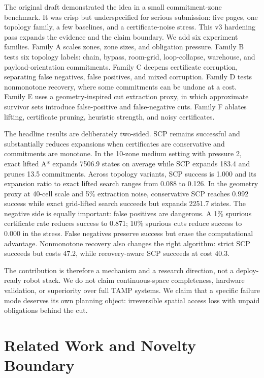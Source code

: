 \documentclass{article}
\begin{document}
The original draft demonstrated the idea in a small commitment-zone benchmark. It was crisp but underspecified for serious submission: five pages, one topology family, a few baselines, and a certificate-noise stress. This v3 hardening pass expands the evidence and the claim boundary. We add six experiment families. Family A scales zones, zone sizes, and obligation pressure. Family B tests six topology labels: chain, bypass, room-grid, loop-collapse, warehouse, and payload-orientation commitments. Family C deepens certificate corruption, separating false negatives, false positives, and mixed corruption. Family D tests nonmonotone recovery, where some commitments can be undone at a cost. Family E uses a geometry-inspired cut extraction proxy, in which approximate survivor sets introduce false-positive and false-negative cuts. Family F ablates lifting, certificate pruning, heuristic strength, and noisy certificates.

The headline results are deliberately two-sided. SCP remains successful and substantially reduces expansions when certificates are conservative and commitments are monotone. In the 10-zone medium setting with pressure 2, exact lifted A* expands 7506.9 states on average while SCP expands 183.4 and prunes 13.5 commitments. Across topology variants, SCP success is 1.000 and its expansion ratio to exact lifted search ranges from 0.088 to 0.126. In the geometry proxy at 40-cell scale and 5\% extraction noise, conservative SCP reaches 0.992 success while exact grid-lifted search succeeds but expands 2251.7 states. The negative side is equally important: false positives are dangerous. A 1\% spurious certificate rate reduces success to 0.871; 10\% spurious cuts reduce success to 0.000 in the stress. False negatives preserve success but erase the computational advantage. Nonmonotone recovery also changes the right algorithm: strict SCP succeeds but costs 47.2, while recovery-aware SCP succeeds at cost 40.3.

The contribution is therefore a mechanism and a research direction, not a deploy-ready robot stack. We do not claim continuous-space completeness, hardware validation, or superiority over full TAMP systems. We claim that a specific failure mode deserves its own planning object: irreversible spatial access loss with unpaid obligations behind the cut.

\section{Related Work and Novelty Boundary}
\end{document}
